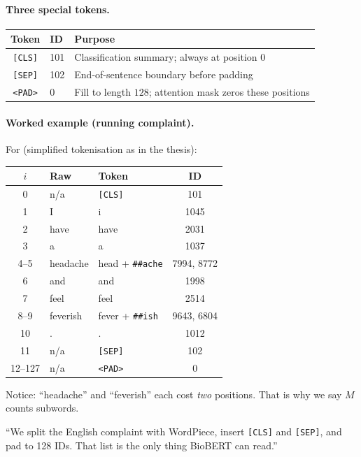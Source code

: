 \paragraph{Three special tokens.}
\begin{center}
\small
\begin{tabular}{@{}clp{8.5cm}@{}}
\toprule
Token & ID & Purpose \\
\midrule
\texttt{[CLS]} & 101 & Classification summary; always at position \(0\) \\
\texttt{[SEP]} & 102 & End-of-sentence boundary before padding \\
\texttt{<PAD>} & 0 & Fill to length \(128\); attention mask zeros these positions \\
\bottomrule
\end{tabular}
\end{center}

\paragraph{Worked example (running complaint).}
For \runningcomplaint{} (simplified tokenisation as in the thesis):

\begin{center}
\footnotesize
\begin{tabular}{@{}cllc@{}}
\toprule
\(i\) & Raw & Token & ID \\
\midrule
0 & n/a & \texttt{[CLS]} & 101 \\
1 & I & i & 1045 \\
2 & have & have & 2031 \\
3 & a & a & 1037 \\
4--5 & headache & head + \texttt{\#\#ache} & 7994, 8772 \\
6 & and & and & 1998 \\
7 & feel & feel & 2514 \\
8--9 & feverish & fever + \texttt{\#\#ish} & 9643, 6804 \\
10 & . & . & 1012 \\
11 & n/a & \texttt{[SEP]} & 102 \\
12--127 & n/a & \texttt{<PAD>} & 0 \\
\bottomrule
\end{tabular}
\end{center}

Notice: ``headache'' and ``feverish'' each cost \emph{two} positions. That is why we say \(M\) counts subwords.

\begin{saybox}
``We split the English complaint with WordPiece, insert \texttt{[CLS]} and \texttt{[SEP]}, and pad to 128 IDs. That list is the only thing BioBERT can read.''
\end{saybox}

